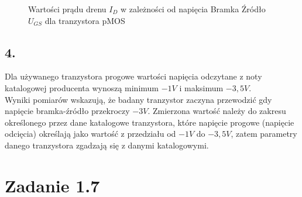 \documentclass[polish,a4paper]{article}
\begin{document}
\begin{figure}[!h]
\centering
{}
\caption{Wartości prądu drenu $I_D$ w zależności od napięcia Bramka Źródło $U_{GS}$ dla tranzystora pMOS}
\label{fig:wykres2}
\end{figure}


\subsection*{4.}
Dla używanego tranzystora progowe wartości napięcia odczytane z noty katalogowej producenta wynoszą minimum $-1V$ i maksimum $-3,5V$.\\
Wyniki pomiarów wskazują, że badany tranzystor zaczyna przewodzić gdy napięcie bramka-źródło przekroczy $-3V$. Zmierzona wartość należy do zakresu określonego przez dane katalogowe tranzystora, które napięcie progowe (napięcie odcięcia) określają jako wartość z przedziału  od $-1V$ do $-3,5V$, zatem parametry danego tranzystora zgadzają się z danymi katalogowymi.


\section{Zadanie 1.7}
\end{document}
